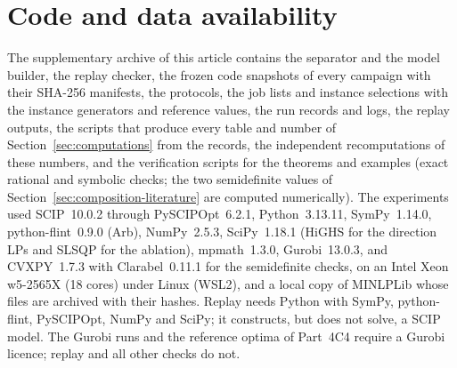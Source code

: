 \section*{Code and data availability}\label{sec:availability}

The supplementary archive of this article contains the separator and the
model builder, the replay checker, the frozen code snapshots of every
campaign with their SHA-256 manifests, the protocols, the job lists and
instance selections with the instance generators and reference values, the
run records and logs, the replay outputs, the scripts that produce every table
and number of Section~\ref{sec:computations} from the records, the
independent recomputations of these numbers, and the verification scripts for
the theorems and examples (exact rational and symbolic checks; the two
semidefinite values of Section~\ref{sec:composition-literature} are computed
numerically). The experiments used SCIP~10.0.2 through PySCIPOpt~6.2.1,
Python~3.13.11, SymPy~1.14.0, python-flint~0.9.0 (Arb), NumPy~2.5.3,
SciPy~1.18.1 (HiGHS \citep{HuangfuHall2018} for the direction LPs and SLSQP
\citep{Kraft1988} for the ablation), mpmath~1.3.0, Gurobi~13.0.3, and CVXPY~1.7.3
with Clarabel~0.11.1 for the semidefinite checks, on an Intel Xeon w5-2565X
(18 cores) under Linux (WSL2), and a local copy of MINLPLib
\citep{BussieckDrudMeeraus2003,Vigerske2026MINLPLib} whose files are archived
with their hashes. Replay needs Python with SymPy, python-flint, PySCIPOpt,
NumPy and SciPy; it constructs, but does not solve, a SCIP model. The Gurobi
runs and the reference optima of Part~4C4 require a Gurobi licence; replay and
all other checks do not.
